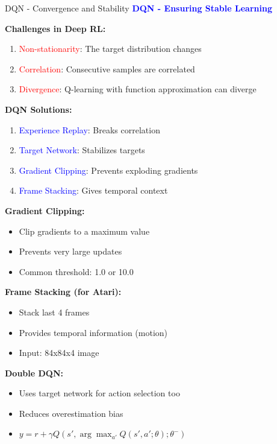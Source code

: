 \documentclass[8pt]{beamer}
\begin{document}
	\begin{frame}{DQN - Convergence and Stability}
		\fontsize{6.5}{7.5}\selectfont
		\textcolor{blue}{\textbf{DQN - Ensuring Stable Learning}}
		
		\textbf{Challenges in Deep RL:}
		\begin{enumerate}
			\item \textcolor{red}{Non-stationarity}: The target distribution changes
			\item \textcolor{red}{Correlation}: Consecutive samples are correlated
			\item \textcolor{red}{Divergence}: Q-learning with function approximation can diverge
		\end{enumerate}
		
		\textbf{DQN Solutions:}
		\begin{enumerate}
			\item \textcolor{blue}{Experience Replay}: Breaks correlation
			\item \textcolor{blue}{Target Network}: Stabilizes targets
			\item \textcolor{blue}{Gradient Clipping}: Prevents exploding gradients
			\item \textcolor{blue}{Frame Stacking}: Gives temporal context
		\end{enumerate}
		
		\textbf{Gradient Clipping:}
		\begin{itemize}
			\item Clip gradients to a maximum value
			\item Prevents very large updates
			\item Common threshold: 1.0 or 10.0
		\end{itemize}
		
		\textbf{Frame Stacking (for Atari):}
		\begin{itemize}
			\item Stack last 4 frames
			\item Provides temporal information (motion)
			\item Input: 84x84x4 image
		\end{itemize}
		
		\textbf{Double DQN:}
		\begin{itemize}
			\item Uses target network for action selection too
			\item Reduces overestimation bias
			\item $y = r + \gamma Q(s', \arg\max_{a'} Q(s',a';\theta); \theta^-)$
		\end{itemize}
		

\end{frame}
\end{document}
